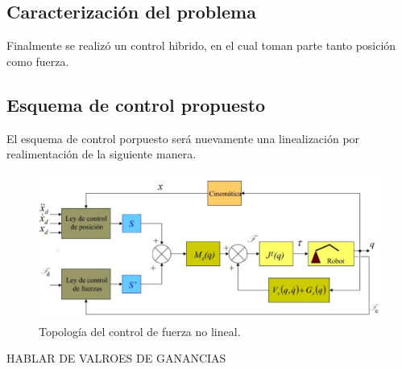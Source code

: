 %

%

\subsection{Caracterizaci\'on del problema}
Finalmente se realiz\'o un control hibrido, en el cual toman parte tanto posici\'on como fuerza.


\subsection{Esquema de control propuesto}
El esquema de control porpuesto ser\'a nuevamente una linealizaci\'on por realimentaci\'on de la siguiente manera.
\begin{figure}[H]
	\centering
	\includegraphics[width=0.8\linewidth]{ImagenesControl híbrido no lineal/controlh}
	\caption{Topolog\'ia del control de fuerza no lineal.}	
	\label{fig:control_f_modelo}
\end{figure}


HABLAR DE VALROES DE GANANCIAS
